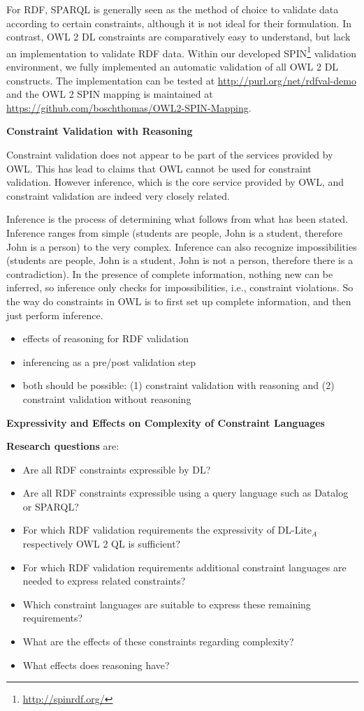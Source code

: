\documentclass{llncs}
\begin{document}
For RDF, SPARQL is generally seen as the method of choice to validate data according to certain constraints, although it is not ideal for their formulation. 
In contrast, OWL 2 DL constraints are comparatively easy to understand, but lack an implementation to validate RDF data.
Within our developed SPIN\footnote{\url{http://spinrdf.org/}} validation environment, we fully implemented an automatic validation of all OWL 2 DL constructs. 
The implementation can be tested at \url{http://purl.org/net/rdfval-demo} and
the OWL 2 SPIN mapping is maintained at \url{https://github.com/boschthomas/OWL2-SPIN-Mapping}.

\textbf{Constraint Validation with Reasoning}

Constraint validation does not appear to be part of the services provided by
OWL.  This has lead to claims that OWL cannot be used for constraint
validation.  However inference, which is the core service provided by OWL,
and constraint validation are indeed very closely related.

Inference is the process of determining what follows from what has been
stated.  Inference ranges from simple (students are people, John is a
student, therefore John is a person) to the very complex.  Inference can
also recognize impossibilities (students are people, John is a student, John
is not a person, therefore there is a contradiction).  In the presence of
complete information, nothing new can be inferred, so inference only checks
for impossibilities, i.e., constraint violations.  So the way do constraints
in OWL is to first set up complete information, and then just perform inference.

\begin{itemize}
	\item effects of reasoning for RDF validation 
	\item inferencing as a pre/post validation step
	\item both should be possible: (1) constraint validation with reasoning and (2) constraint validation without reasoning 
\end{itemize}

\textbf{Expressivity and Effects on Complexity of Constraint Languages}

\textbf{Research questions} are:
\begin{itemize}
	\item Are all RDF constraints expressible by DL?
	\item Are all RDF constraints expressible using a query language such as Datalog or SPARQL?
	\item For which RDF validation requirements the expressivity of DL-Lite$_A$ respectively OWL 2 QL is sufficient?
	\item For which RDF validation requirements additional constraint languages are needed to express related constraints?
	\item Which constraint languages are suitable to express these remaining requirements?
	\item What are the effects of these constraints regarding complexity?
	\item What effects does reasoning have?
\end{itemize}
\end{document}
